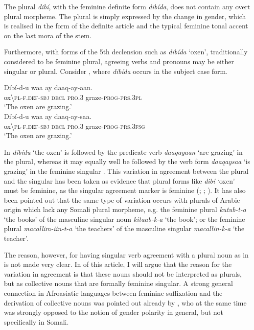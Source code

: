 \documentclass[output=paper]{langsci/langscibook}
\begin{document}
The plural \textit{dibí}, with the feminine definite form \textit{dibída}, does not contain any overt plural morpheme. The plural is simply expressed by the change in gender, which is realised in the form of the definite article and the typical feminine tonal accent on the last mora of the stem. 

Furthermore, with forms of the 5th declension such as \textit{dibída} ‘oxen’, traditionally considered to be feminine plural, agreeing verbs and pronouns may be either singular or plural. Consider , where \textit{dibída} occurs in the subject case form.

\ea\label{ex:nilsson:1}
\ea\label{ex:nilsson:1a}
\gll  Dibí-d-u             waa  ay{\rmfnm}   daaq-ay-aan.   \\
        ox{\textbackslash}\textsc{pl-f.def-sbj}  \textsc{decl}   \textsc{pro.3}   graze-\textsc{prog-prs.3pl}\\
\glt      ‘The oxen are grazing.’\\
\ex\label{ex:nilsson:1b}
\gll   Dibí-d-u        waa  ay   daaq-ay-saa.\\
       ox{\textbackslash}\textsc{pl-f.def-sbj}  \textsc{decl}   \textsc{pro.3}  graze-\textsc{prog-prs.3fsg}\\
\glt   ‘The oxen are grazing.’
\z
\z


In  \textit{dibídu} ‘the oxen’ is followed by the predicate verb \textit{daaqayaan} ‘are grazing’ in the plural, whereas it may equally well be followed by the verb form \textit{daaqaysaa} ‘is grazing’ in the feminine singular . This variation in agreement between the plural and the singular has been taken as evidence that plural forms like \textit{dibí} ‘oxen’ must be feminine, as the singular agreement marker is feminine (\citealt[259--260]{Hetzron1972}; \citealt[391--393]{ZwickyPullum1983}; \citealt[134--137]{Lecarme2002}). It has also been pointed out that the same type of variation occurs with plurals of Arabic origin which lack any Somali plural morpheme, e.g. the feminine plural \textit{kutub-t-a} ‘the books’ of the masculine singular noun \textit{kitaab-k-a} ‘the book’; or the feminine plural \textit{macallim-iin-t-a} ‘the teachers’ of the masculine singular \textit{macallin-k-a} ‘the teacher’.

The reason, however, for having singular verb agreement with a plural noun as in  is not made very clear. In  of this article, I will argue that the reason for the variation in agreement is that these nouns should not be interpreted as plurals, but as collective nouns that are formally feminine singular. A strong general connection in Afroasiatic languages between feminine suffixation and the derivation of collective nouns was pointed out already by \citet{Speiser1938}, who at the same time was strongly opposed to the notion of gender polarity in general, but not specifically in Somali.
\end{document}
